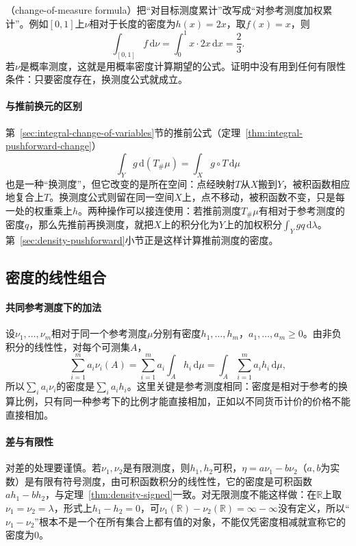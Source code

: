 （change-of-measure formula）把“对目标测度累计”改写成“对参考测度加权累计”。例如$[0,1]$上$\nu$相对于长度的密度为$h(x)=2x$，取$f(x)=x$，则
\[
 \int_{[0,1]}f\,\mathrm d\nu=\int_0^1x\cdot2x\,\mathrm dx=\frac23 .
\]
若$\nu$是概率测度，这就是用概率密度计算期望的公式。证明中没有用到任何有限性条件：只要密度存在，换测度公式就成立。

\paragraph{与推前换元的区别}
第~\ref{sec:integral-change-of-variables}节的推前公式（定理~\ref{thm:integral-pushforward-change}）
\[
 \int_Yg\,\mathrm d(T_\#\mu)=\int_Xg\circ T\,\mathrm d\mu
\]
也是一种“换测度”，但它改变的是所在空间：点经映射$T$从$X$搬到$Y$，被积函数相应地复合上$T$。换测度公式则留在同一空间$X$上，点不移动，被积函数不变，只是每一处的权重乘上$h$。两种操作可以接连使用：若推前测度$T_\#\mu$有相对于参考测度的密度$q$，那么先推前再换测度，就把$X$上的积分化为$Y$上的加权积分$\int_Ygq\,\mathrm d\lambda$。第~\ref{sec:density-pushforward}小节正是这样计算推前测度的密度。

\subsection{密度的线性组合}
\label{sec:density-linear}

\paragraph{共同参考测度下的加法}
设$\nu_1,\dots,\nu_m$相对于同一个参考测度$\mu$分别有密度$h_1,\dots,h_m$，$a_1,\dots,a_m\ge0$。由非负积分的线性性，对每个可测集$A$，
\[
 \sum_{i=1}^ma_i\nu_i(A)=\sum_{i=1}^ma_i\int_Ah_i\,\mathrm d\mu=\int_A\sum_{i=1}^ma_ih_i\,\mathrm d\mu,
\]
所以$\sum_ia_i\nu_i$的密度是$\sum_ia_ih_i$。这里关键是参考测度相同：密度是相对于参考的换算比例，只有同一种参考下的比例才能直接相加，正如以不同货币计价的价格不能直接相加。

\paragraph{差与有限性}
对差的处理要谨慎。若$\nu_1,\nu_2$是有限测度，则$h_1,h_2$可积，$\eta=a\nu_1-b\nu_2$（$a,b$为实数）是有限有符号测度，由可积函数积分的线性性，它的密度是可积函数$ah_1-bh_2$，与定理~\ref{thm:density-signed}一致。对无限测度不能这样做：在$\mathbb R$上取$\nu_1=\nu_2=\lambda$，形式上$h_1-h_2=0$，可$\nu_1(\mathbb R)-\nu_2(\mathbb R)=\infty-\infty$没有定义，所以“$\nu_1-\nu_2$”根本不是一个在所有集合上都有值的对象，不能仅凭密度相减就宣称它的密度为$0$。

